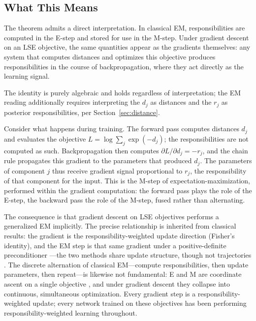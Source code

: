 \subsection{What This Means}

The theorem admits a direct interpretation. In classical EM, responsibilities are computed in the E-step and stored for use in the M-step. Under gradient descent on an LSE objective, the same quantities appear as the gradients themselves: any system that computes distances and optimizes this objective produces responsibilities in the course of backpropagation, where they act directly as the learning signal.

The identity is purely algebraic and holds regardless of interpretation; the EM reading additionally requires interpreting the $d_j$ as distances and the $r_j$ as posterior responsibilities, per Section~\ref{sec:distance}.

Consider what happens during training. The forward pass computes distances $d_j$ and evaluates the objective $L = \log \sum_j \exp(-d_j)$; the responsibilities are not computed as such. Backpropagation then computes $\partial L / \partial d_j = -r_j$, and the chain rule propagates this gradient to the parameters that produced $d_j$. The parameters of component $j$ thus receive gradient signal proportional to $r_j$, the responsibility of that component for the input. This is the M-step of expectation-maximization, performed within the gradient computation: the forward pass plays the role of the E-step, the backward pass the role of the M-step, fused rather than alternating.

The consequence is that gradient descent on LSE objectives performs a generalized EM implicitly. The precise relationship is inherited from classical results: the gradient is the responsibility-weighted update direction (Fisher's identity), and the EM step is that same gradient under a positive-definite preconditioner \citep{xu1996convergence}---the two methods share update structure, though not trajectories \citep{zhang2020comparing}. The discrete alternation of classical EM---compute responsibilities, then update parameters, then repeat---is likewise not fundamental: E and M are coordinate ascent on a single objective \citep{neal1998view}, and under gradient descent they collapse into continuous, simultaneous optimization. Every gradient step is a responsibility-weighted update; every network trained on these objectives has been performing responsibility-weighted learning throughout.

